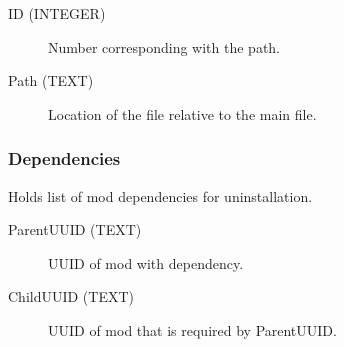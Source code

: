 \begin{description}
\item[ID (INTEGER)] Number corresponding with the path.
\item[Path (TEXT)] Location of the file relative to the main file.
\end{description}

\subsubsection{Dependencies}
Holds list of mod dependencies for uninstallation.

\begin{description}
\item[ParentUUID (TEXT)] UUID of mod with dependency.
\item[ChildUUID (TEXT)] UUID of mod that is required by ParentUUID.
\end{description}
